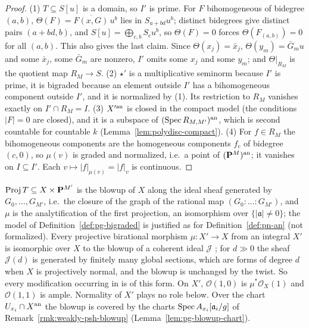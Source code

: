 \begin{proof}
(1) $T\subseteq S[u]$ is a domain, so $I'$ is prime. For $F$ bihomogeneous of bidegree $(a,b)$, $\Theta(F)=\overline{F(x,G)}\,u^b$ lies in
$S_{a+bd}u^b$; distinct bidegrees give distinct pairs $(a+bd,b)$, and $S[u]=\bigoplus_{c,b}S_cu^b$, so $\Theta(F)=0$ forces
$\Theta(F_{(a,b)})=0$ for all $(a,b)$. This also gives the last claim. Since $\Theta(x_j)=\bar x_j$, $\Theta(y_m)=\bar G_mu$ and some
$\bar x_j$, some $\bar G_m$ are nonzero, $I'$ omits some $x_j$ and some $y_m$; and $\Theta|_{R_M}$ is the quotient map $R_M\to S$.
(2) $\star'$ is a multiplicative seminorm because $I'$ is prime, it is bigraded because an element outside $I'$ has a bihomogeneous
component outside $I'$, and it is normalized by (1). Its restriction to $R_M$ vanishes exactly on $I'\cap R_M=I$.
(3) $X'^{\mathrm{an}}$ is closed in the compact model (the conditions $|F|=0$ are closed), and it is a subspace of
$(\operatorname{Spec} R_{M,M'})^{\mathrm{an}}$, which is second countable for countable $k$ (Lemma~\ref{lem:polydisc-compact}).
(4) For $f\in R_M$ the bihomogeneous components are the homogeneous components $f_c$ of bidegree $(c,0)$, so $\mu(v)$ is graded
and normalized, i.e.\ a point of $(\mathbf{P}^M)^{\mathrm{an}}$; it vanishes on $I\subseteq I'$. Each $v\mapsto|f|_{\mu(v)}=|f|_v$ is continuous.
\end{proof}

\begin{remark}\label{rmk:pg-blowup-model}
$\operatorname{Proj}T\subseteq X\times\mathbf{P}^{M'}$ is the blowup of $X$ along the ideal sheaf generated by $G_0,\dots,G_{M'}$, i.e.\ the closure of
the graph of the rational map $(G_0:\dots:G_{M'})$, and $\mu$ is the analytification of the first projection, an isomorphism over
$\{|\mathfrak a|\ne0\}$; the model of Definition~\ref{def:pg-bigraded} is justified as for Definition~\ref{def:pn-an} (not formalized).
Every projective birational morphism $\mu\colon X'\to X$ from an integral $X'$ is isomorphic over $X$ to the blowup of a coherent ideal
$\mathcal J$ \cite[II.7.17]{Hartshorne}; for $d\gg0$ the sheaf $\mathcal J(d)$ is generated by finitely many global sections, which are
forms of degree $d$ when $X$ is projectively normal, and the blowup is unchanged by the twist. So every modification occurring in
\cite[Corollary~5.26]{FHX} is of this form. On $X'$, $\mathcal O(1,0)$ is $\mu^*\mathcal O_X(1)$ and $\mathcal O(1,1)$ is ample. Normality of $X'$
plays no role below. Over the chart $U_{x_i}\cap X^{\mathrm{an}}$ the blowup is covered by the charts $\operatorname{Spec} A_{x_i}[\mathfrak a_i/g]$ of
Remark~\ref{rmk:weakly-psh-blowup} (Lemma~\ref{lem:pg-blowup-chart}).
\end{remark}

